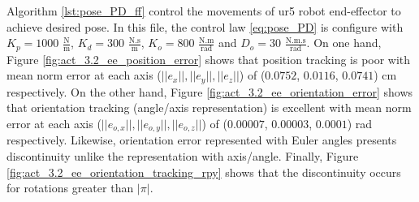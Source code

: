 Algorithm \ref{lst:pose_PD_ff} control the movements of ur5 robot end-effector to achieve desired pose. In this file, the control law \ref{eq:pose_PD} is configure with ${K_{p}}=1000$ $\mathrm{\frac{N}{m}}$, $K_{d}= 300$ $\mathrm{\frac{N.s}{m}}$, ${K_{o}}=800$ $\mathrm{\frac{N.m}{rad}}$ and $D_{o}= 30$ $\mathrm{\frac{N.m.s}{rad}}$. On one hand, Figure \ref{fig:act_3.2_ee_position_error} shows that position tracking is poor with mean norm error at each axis ($||e_x||, ||e_y||, ||e_z||$) of ($0.0752$, $0.0116$, $0.0741$) cm respectively. On the other hand, Figure \ref{fig:act_3.2_ee_orientation_error} shows that orientation tracking (angle/axis representation) is excellent with mean norm error at each axis ($||e_{o,x}||, ||e_{o,y}||, ||e_{o,z}||$) of ($0.00007$, $0.00003$, $0.0001$) rad respectively. Likewise, orientation error represented with Euler angles presents discontinuity unlike the representation with axis/angle. Finally, Figure \ref{fig:act_3.2_ee_orientation_tracking_rpy} shows that the discontinuity occurs for rotations greater than $|\pi|$. \vspace{.5cm}

